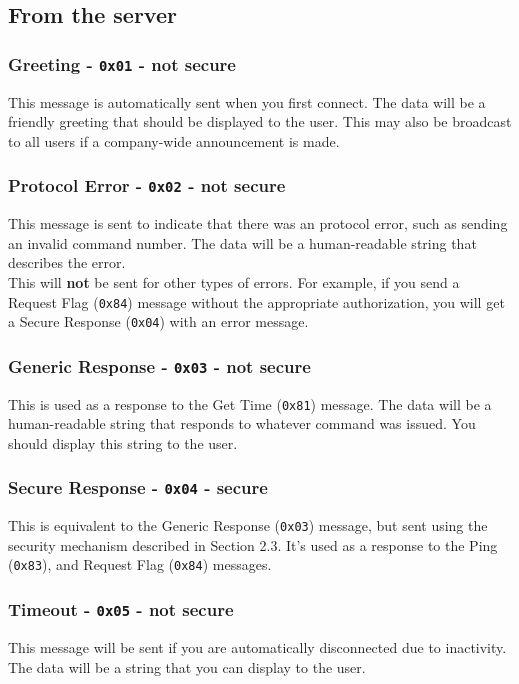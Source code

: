 \documentclass{report}
\newcommand{\code}[1]{\texttt{#1}}
\begin{document}
\subsection{From the server}
\subsubsection{Greeting - \code{0x01} - not secure}
This message is automatically sent when you first connect.
The data will be a friendly greeting that should be displayed to the user.
This may also be broadcast to all users if a company-wide announcement is made.

\subsubsection{Protocol Error - \code{0x02} - not secure}
This message is sent to indicate that there was an protocol error, such as sending an invalid command number.
The data will be a human-readable string that describes the error. \\
This will \textbf{not} be sent for other types of errors.
For example, if you send a Request Flag (\code{0x84}) message without the appropriate authorization, you will get a Secure Response (\code{0x04}) with an error message.

\subsubsection{Generic Response - \code{0x03} - not secure}
This is used as a response to the Get Time (\code{0x81}) message.
The data will be a human-readable string that responds to whatever command was issued. You should display this string to the user.

\subsubsection{Secure Response - \code{0x04} - secure}
This is equivalent to the Generic Response (\code{0x03}) message, but sent using the security mechanism described in Section 2.3.
It's used as a response to the Ping (\code{0x83}), and Request Flag (\code{0x84}) messages.

\subsubsection{Timeout - \code{0x05} - not secure}
This message will be sent if you are automatically disconnected due to inactivity. The data will be a string that you can display to the user.
\end{document}
